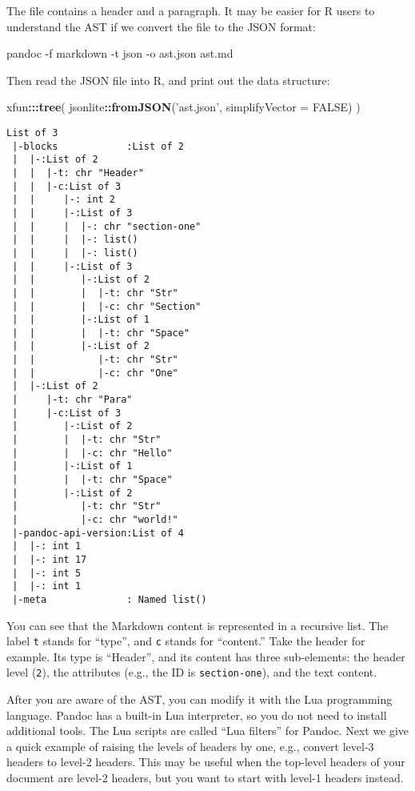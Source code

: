 \documentclass[
  11pt,
]{krantz}
\newenvironment{Shaded}{\begin{snugshade}}{\end{snugshade}}
\newcommand{\DataTypeTok}[1]{\textcolor[rgb]{0.27,0.27,0.27}{#1}}
\newcommand{\ExtensionTok}[1]{#1}
\newcommand{\KeywordTok}[1]{\textcolor[rgb]{0.27,0.27,0.27}{\textbf{#1}}}
\newcommand{\NormalTok}[1]{#1}
\newcommand{\OperatorTok}[1]{\textcolor[rgb]{0.43,0.43,0.43}{\textbf{#1}}}
\newcommand{\OtherTok}[1]{\textcolor[rgb]{0.37,0.37,0.37}{#1}}
\newcommand{\StringTok}[1]{\textcolor[rgb]{0.5,0.5,0.5}{#1}}
\begin{document}
The file contains a header and a paragraph. It may be easier for R users to understand the AST if we convert the file to the JSON format:

\begin{Shaded}
\begin{Highlighting}[]
\ExtensionTok{pandoc}\NormalTok{ -f markdown -t json -o ast.json ast.md}
\end{Highlighting}
\end{Shaded}

Then read the JSON file into R, and print out the data structure:

\begin{Shaded}
\begin{Highlighting}[]
\NormalTok{xfun}\OperatorTok{:::}\KeywordTok{tree}\NormalTok{(}
\NormalTok{  jsonlite}\OperatorTok{::}\KeywordTok{fromJSON}\NormalTok{(}\StringTok{'ast.json'}\NormalTok{, }\DataTypeTok{simplifyVector =} \OtherTok{FALSE}\NormalTok{)}
\NormalTok{)}
\end{Highlighting}
\end{Shaded}

\begin{verbatim}
List of 3
 |-blocks            :List of 2
 |  |-:List of 2
 |  |  |-t: chr "Header"
 |  |  |-c:List of 3
 |  |     |-: int 2
 |  |     |-:List of 3
 |  |     |  |-: chr "section-one"
 |  |     |  |-: list()
 |  |     |  |-: list()
 |  |     |-:List of 3
 |  |        |-:List of 2
 |  |        |  |-t: chr "Str"
 |  |        |  |-c: chr "Section"
 |  |        |-:List of 1
 |  |        |  |-t: chr "Space"
 |  |        |-:List of 2
 |  |           |-t: chr "Str"
 |  |           |-c: chr "One"
 |  |-:List of 2
 |     |-t: chr "Para"
 |     |-c:List of 3
 |        |-:List of 2
 |        |  |-t: chr "Str"
 |        |  |-c: chr "Hello"
 |        |-:List of 1
 |        |  |-t: chr "Space"
 |        |-:List of 2
 |           |-t: chr "Str"
 |           |-c: chr "world!"
 |-pandoc-api-version:List of 4
 |  |-: int 1
 |  |-: int 17
 |  |-: int 5
 |  |-: int 1
 |-meta              : Named list()
\end{verbatim}

You can see that the Markdown content is represented in a recursive list. The label \texttt{t} stands for ``type'', and \texttt{c} stands for ``content.'' Take the header for example. Its type is ``Header'', and its content has three sub-elements: the header level (\texttt{2}), the attributes (e.g., the ID is \texttt{section-one}), and the text content.

After you are aware of the AST, you can modify it with the Lua programming language. Pandoc has a built-in Lua interpreter, so you do not need to install additional tools. The Lua scripts are called ``Lua filters'' for Pandoc. Next we give a quick example of raising the levels of headers by one, e.g., convert level-3 headers to level-2 headers. This may be useful when the top-level headers of your document are level-2 headers, but you want to start with level-1 headers instead.
\end{document}
